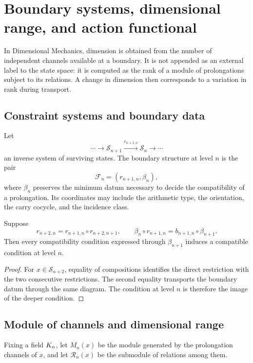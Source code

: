 \chapter{Boundary systems, dimensional range, and action functional}
\label{chap:pantalla}

In Dimensional Mechanics, dimension is obtained from the number of
independent channels available at a boundary. It is not appended as an external label
to the state space: it is computed as the rank of a module of prolongations
subject to its relations. A change in dimension then corresponds to a
variation in rank during transport.

\section{Constraint systems and boundary data}

Let
\[
 \cdots\longrightarrow\mathcal S_{n+1}
 \xrightarrow{r_{n+1,n}}\mathcal S_n\longrightarrow\cdots
\]
an inverse system of surviving states. The boundary structure at
level \(n\) is the pair
\[
 \mathcal F_n=(r_{n+1,n},\beta_n),
\]
where \(\beta_n\) preserves the minimum datum necessary to decide the
compatibility of a prolongation. Its coordinates may include the arithmetic
type, the orientation, the carry cocycle, and the incidence class.

\begin{lemma}
Suppose
\[
 r_{n+2,n}=r_{n+1,n}\circ r_{n+2,n+1},
 \qquad
 \beta_n\circ r_{n+1,n}
 =b_{n+1,n}\circ\beta_{n+1}.
\]
Then every compatibility condition expressed through \(\beta_{n+1}\)
induces a compatible condition at level \(n\).
\end{lemma}
\begin{proof}
For \(x\in\mathcal S_{n+2}\), equality of compositions identifies the
direct restriction with the two consecutive restrictions. The second
equality transports the boundary datum through the same diagram. The
condition at level \(n\) is therefore the image of the deeper
condition.
\end{proof}

\section{Module of channels and dimensional range}

Fixing a field \(K_n\), let \(M_n(x)\) be the module generated by the
prolongation channels of \(x\), and let \(\mathcal R_n(x)\) be the submodule of
relations among them.

